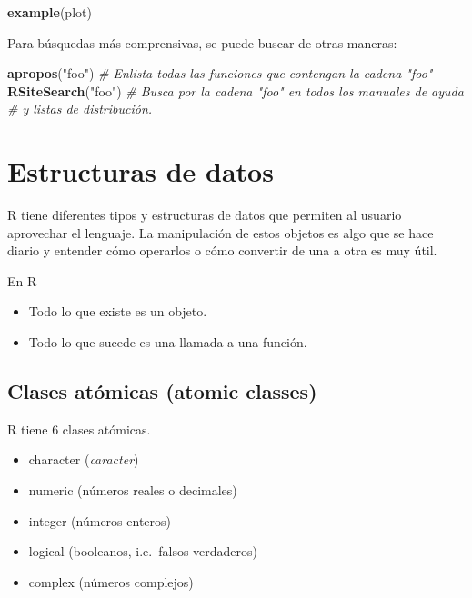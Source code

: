 \documentclass[]{article}
\newenvironment{Shaded}{\begin{snugshade}}{\end{snugshade}}
\newcommand{\KeywordTok}[1]{\textcolor[rgb]{0.13,0.29,0.53}{\textbf{{#1}}}}
\newcommand{\StringTok}[1]{\textcolor[rgb]{0.31,0.60,0.02}{{#1}}}
\newcommand{\CommentTok}[1]{\textcolor[rgb]{0.56,0.35,0.01}{\textit{{#1}}}}
\newcommand{\NormalTok}[1]{{#1}}
\begin{document}
\begin{Shaded}
\begin{Highlighting}[]
\KeywordTok{example}\NormalTok{(plot)}
\end{Highlighting}
\end{Shaded}

Para búsquedas más comprensivas, se puede buscar de otras maneras:

\begin{Shaded}
\begin{Highlighting}[]
\KeywordTok{apropos}\NormalTok{(}\StringTok{"foo"}\NormalTok{) }\CommentTok{# Enlista todas las funciones que contengan la cadena "foo"}
\KeywordTok{RSiteSearch}\NormalTok{(}\StringTok{"foo"}\NormalTok{) }\CommentTok{# Busca por la cadena "foo" en todos los manuales de ayuda }
\CommentTok{# y listas de distribución.}
\end{Highlighting}
\end{Shaded}

\section{Estructuras de datos}\label{estructuras-de-datos}

R tiene diferentes tipos y estructuras de datos que permiten al usuario
aprovechar el lenguaje. La manipulación de estos objetos es algo que se
hace diario y entender cómo operarlos o cómo convertir de una a otra es
muy útil.

\renewcommand\bcStyleTitre[1]{\large\textcolor{ttblue}{#1}}

\begin{bclogo}[
  couleur=bgblue,
  arrondi=0,
  logo=\bcattention,
  barre=none,
  noborder=true]{En R}
\begin{itemize}
\item Todo lo que existe es un objeto.
\item Todo lo que sucede es una llamada a una función.
\end{itemize}
\end{bclogo}

\subsection{Clases atómicas (atomic
classes)}\label{clases-atomicas-atomic-classes}

R tiene 6 clases atómicas.

\begin{itemize}
\itemsep1pt\parskip0pt
\item
  character (\emph{caracter})
\item
  numeric (números reales o decimales)
\item
  integer (números enteros)
\item
  logical (booleanos, i.e.~falsos-verdaderos)
\item
  complex (números complejos)
\end{itemize}
\end{document}
